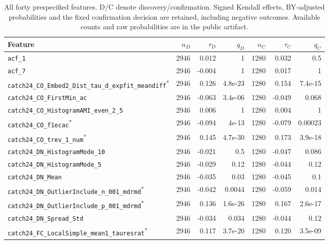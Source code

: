 \begingroup\footnotesize\setlength{\tabcolsep}{3pt}
\begin{longtable}{p{}rrrrrr}
\caption{All forty prespecified features. D/C denote discovery/confirmation. Signed Kendall effects, BY-adjusted probabilities and the fixed confirmation decision are retained, including negative outcomes. Available counts and raw probabilities are in the public artifact.}\\
\toprule Feature & $n_D$ & $\tau_D$ & $q_D$ & $n_C$ & $\tau_C$ & $q_C$\\\midrule\endhead
\raggedright \nolinkurl{acf_1} & 2946 & 0.012 & 1 & 1280 & 0.032 & 0.5 \\
\raggedright \nolinkurl{acf_7} & 2946 & -0.004 & 1 & 1280 & 0.017 & 1 \\
\raggedright \nolinkurl{catch24_CO_Embed2_Dist_tau_d_expfit_meandiff}\textsuperscript{*} & 2946 & 0.126 & 4.8e-23 & 1280 & 0.154 & 7.4e-15 \\
\raggedright \nolinkurl{catch24_CO_FirstMin_ac} & 2946 & -0.063 & 3.4e-06 & 1280 & -0.049 & 0.068 \\
\raggedright \nolinkurl{catch24_CO_HistogramAMI_even_2_5} & 2946 & 0.006 & 1 & 1280 & 0.004 & 1 \\
\raggedright \nolinkurl{catch24_CO_f1ecac}\textsuperscript{*} & 2946 & -0.094 & 4e-13 & 1280 & -0.079 & 0.00023 \\
\raggedright \nolinkurl{catch24_CO_trev_1_num}\textsuperscript{*} & 2946 & 0.145 & 4.7e-30 & 1280 & 0.173 & 3.9e-18 \\
\raggedright \nolinkurl{catch24_DN_HistogramMode_10} & 2946 & -0.021 & 0.5 & 1280 & -0.047 & 0.086 \\
\raggedright \nolinkurl{catch24_DN_HistogramMode_5} & 2946 & -0.029 & 0.12 & 1280 & -0.044 & 0.12 \\
\raggedright \nolinkurl{catch24_DN_Mean} & 2946 & -0.035 & 0.03 & 1280 & -0.045 & 0.1 \\
\raggedright \nolinkurl{catch24_DN_OutlierInclude_n_001_mdrmd}\textsuperscript{*} & 2946 & -0.042 & 0.0044 & 1280 & -0.059 & 0.014 \\
\raggedright \nolinkurl{catch24_DN_OutlierInclude_p_001_mdrmd}\textsuperscript{*} & 2946 & 0.136 & 1.6e-26 & 1280 & 0.167 & 2.6e-17 \\
\raggedright \nolinkurl{catch24_DN_Spread_Std} & 2946 & -0.034 & 0.034 & 1280 & -0.044 & 0.12 \\
\raggedright \nolinkurl{catch24_FC_LocalSimple_mean1_tauresrat}\textsuperscript{*} & 2946 & 0.117 & 3.7e-20 & 1280 & 0.120 & 3.5e-09 \\

\end{longtable}

